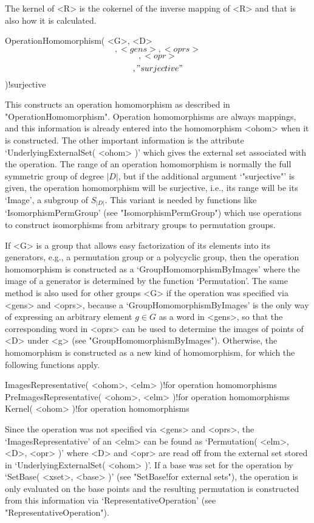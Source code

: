 The kernel of <R> is the cokernel of the  inverse mapping of <R> and that
is also how it is calculated.

\stars

\>OperationHomomorphism( <G>, <D> \[, <gens>, <oprs> \] \[, <opr> \] %
                         \[, "surjective" \] )!{surjective}
%

This    constructs   an    operation homomorphism     as    described  in
"OperationHomomorphism". Operation homomorphisms are always mappings, and
this information is already entered  into the homomorphism <ohom> when it
is  constructed.  The  other  important  information   is  the  attribute
`UnderlyingExternalSet( <ohom> )' which gives the external set associated
with  the operation. The range  of an  operation homomorphism is normally
the full symmetric group of degree $|D|$,  but if the additional argument
`"surjective"' is given, the  operation homomorphism will  be surjective,
i.e., its  range  will be its   `Image', a  subgroup  of  $S_{|D|}$. This
variant   is  needed   by   functions  like   `IsomorphismPermGroup' (see
"IsomorphismPermGroup")  which use  operations to  construct isomorphisms
from arbitrary groups to permutation groups.

If <G> is a group that allows easy factorization of its elements into its
generators, e.g.,  a permutation  group or a  polycyclic  group, then the
operation homomorphism  is constructed  as  a `GroupHomomorphismByImages'
where  the  image   of  a generator   is  determined    by the   function
`Permutation'. The same method is  also used for  other groups <G> if the
operation    was  specified  via     <gens>   and  <oprs>,    because   a
`GroupHomomorphismByImages' is the  only way  of expressing an  arbitrary
element $g\in G$ as  a word in <gens>, so  that the corresponding word in
<oprs> can  be used to determine  the images of  points  of <D> under <g>
(see   "GroupHomomorphismByImages").   Otherwise,  the homomorphism    is
constructed  as  a new   kind of homomorphism,   for which  the following
functions apply.

\>ImagesRepresentative( <ohom>, <elm> )!{for operation homomorphisms}
\>PreImagesRepresentative( <ohom>, <elm> )!{for operation homomorphisms}
\>Kernel( <ohom> )!{for operation homomorphisms}

Since the  operation  was not    specified  via <gens>   and <oprs>,  the
`ImagesRepresentative'  of an <elm> can  be found as `Permutation( <elm>,
<D>, <opr> )' where  <D>  and <opr> are read   off from the external  set
stored in  `UnderlyingExternalSet( <ohom> )'. If a  base was  set for the
operation  by `SetBase(  <xset>,   <base> )'  (see "SetBase!for  external
sets"),   the operation is   only evaluated on   the base  points and the
resulting  permutation   is   constructed  from  this    information  via
`RepresentativeOperation' (see "RepresentativeOperation").

